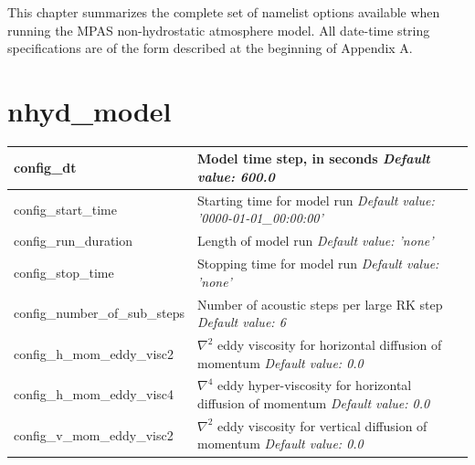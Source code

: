 \documentclass[11pt]{report}
\begin{document}
This chapter summarizes the complete set of namelist options available when running the MPAS non-hydrostatic atmosphere model.
All date-time string specifications are of the form described at the beginning of Appendix A.

\section{nhyd\_model}

{\small
\begin{longtable}{|p{1.75in} |p{4.5in}|}
 \hline   

   config\_dt & Model time step, in seconds \newline 
   {\em Default value: 600.0} \\ \hline

   config\_start\_time & Starting time for model run \newline 
   {\em Default value: '0000-01-01\_00:00:00'} \\ \hline

   config\_run\_duration & Length of model run \newline 
   {\em Default value: 'none'} \\ \hline

   config\_stop\_time  & Stopping time for model run \newline 
   {\em Default value: 'none'} \\ \hline

   config\_number\_of\_sub\_steps & Number of acoustic steps per large RK step \newline 
   {\em Default value: 6} \\ \hline

   config\_h\_mom\_eddy\_visc2 & $\nabla^2$ eddy viscosity for horizontal diffusion of momentum \newline 
   {\em Default value: 0.0} \\ \hline

   config\_h\_mom\_eddy\_visc4 & $\nabla^4$ eddy hyper-viscosity for horizontal diffusion of momentum \newline 
   {\em Default value: 0.0} \\ \hline

   config\_v\_mom\_eddy\_visc2 & $\nabla^2$ eddy viscosity for vertical diffusion of momentum \newline 
   {\em Default value: 0.0} \\ \hline


\end{longtable}}
\end{document}
